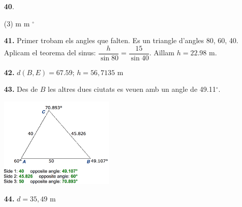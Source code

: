 \documentclass[a4paper, pdf, twoside]{book}
\begin{document}
\begin{multicols}{2}
\begin{enumerate}
 \item[\fontfamily{phv}\selectfont\color{blue}\textbf{40}. ] 
 \begin{tasks}[column-sep=1em, item-indent=1.3333em](3)
	  m
	  m
	 $^\circ $
\end{tasks}
\vspace{0.25cm}
\item[\fontfamily{phv}\selectfont\color{blue}\textbf{41. }] 
Primer trobam els angles que falten. Es un triangle d'angles 80, 60, 40. Aplicam el teorema del sinus: $\dfrac {h}{\sin 80}=\dfrac {15}{\sin 40}$. Aïllam $h =22.98$ m.
\vspace{0.25cm}
\item[\fontfamily{phv}\selectfont\color{blue}\textbf{42. }] 
$d(B, E) = 67.59$; $h = 56,7135$ m
\vspace{0.25cm}
\item[\fontfamily{phv}\selectfont\color{blue}\textbf{43. }] 
Des de $B$ les altres dues ciutats es veuen amb un angle de 49.11$^\circ $. \par \includegraphics [width=0.43\textwidth ]{img-sol/t3-43}
\vspace{0.25cm}
\item[\fontfamily{phv}\selectfont\color{blue}\textbf{44. }]  \scalebox{0.6}{\simbolclau } 
$d=35,49$ m
 \end{enumerate}
\vspace{0.3cm}



\end{multicols}
\end{document}
